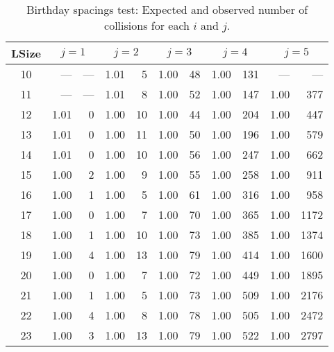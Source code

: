 \begin {table}
\centering
\caption {Birthday spacings test: Expected and 
  observed number of collisions for each $i$ and $j$.}
\label {tab:birth.res1}
\smallskip
\begin {tabular}{|c|@{\extracolsep{10pt}}rr|rr|rr|rr|rr|}
\hline
 LSize& \multicolumn{2}{c|}{$  j=1 $} & \multicolumn{2}{c|}{$  j=2 $} & \multicolumn{2}{c|}{$  j=3 $} & \multicolumn{2}{c|}{$  j=4 $} & \multicolumn{2}{c|}{$  j=5 $}  \\
\hline
 10 &   ---    &   ---    &     1.01 &        5 &     1.00 &       48 &     1.00 &      131 &   ---    &   ---    \\
 11 &   ---    &   ---    &     1.01 &        8 &     1.00 &       52 &     1.00 &      147 &     1.00 &      377 \\
 12 &     1.01 &        0 &     1.00 &       10 &     1.00 &       44 &     1.00 &      204 &     1.00 &      447 \\
 13 &     1.01 &        0 &     1.00 &       11 &     1.00 &       50 &     1.00 &      196 &     1.00 &      579 \\
 14 &     1.01 &        0 &     1.00 &       10 &     1.00 &       56 &     1.00 &      247 &     1.00 &      662 \\
 15 &     1.00 &        2 &     1.00 &        9 &     1.00 &       55 &     1.00 &      258 &     1.00 &      911 \\
 16 &     1.00 &        1 &     1.00 &        5 &     1.00 &       61 &     1.00 &      316 &     1.00 &      958 \\
 17 &     1.00 &        0 &     1.00 &        7 &     1.00 &       70 &     1.00 &      365 &     1.00 &     1172 \\
 18 &     1.00 &        1 &     1.00 &       10 &     1.00 &       73 &     1.00 &      385 &     1.00 &     1374 \\
 19 &     1.00 &        4 &     1.00 &       13 &     1.00 &       79 &     1.00 &      414 &     1.00 &     1600 \\
 20 &     1.00 &        0 &     1.00 &        7 &     1.00 &       72 &     1.00 &      449 &     1.00 &     1895 \\
 21 &     1.00 &        1 &     1.00 &        5 &     1.00 &       73 &     1.00 &      509 &     1.00 &     2176 \\
 22 &     1.00 &        4 &     1.00 &        8 &     1.00 &       78 &     1.00 &      505 &     1.00 &     2472 \\
 23 &     1.00 &        3 &     1.00 &       13 &     1.00 &       79 &     1.00 &      522 &     1.00 &     2797 \\

\end{tabular}
\end{table}
